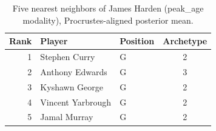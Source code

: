 \begin{table}[htbp]
  \centering\small
  \begin{tabular}{rllc}
    \toprule
    Rank & Player & Position & Archetype \\
    \midrule
    1 & Stephen Curry & G & 2 \\
    2 & Anthony Edwards & G & 3 \\
    3 & Kyshawn George & G & 2 \\
    4 & Vincent Yarbrough & G & 2 \\
    5 & Jamal Murray & G & 2 \\
    \bottomrule
  \end{tabular}
  \caption{Five nearest neighbors of James Harden (peak_age modality), Procrustes-aligned posterior mean.}
  \label{tab:James_Harden_neighbors_peak_age}
\end{table}


